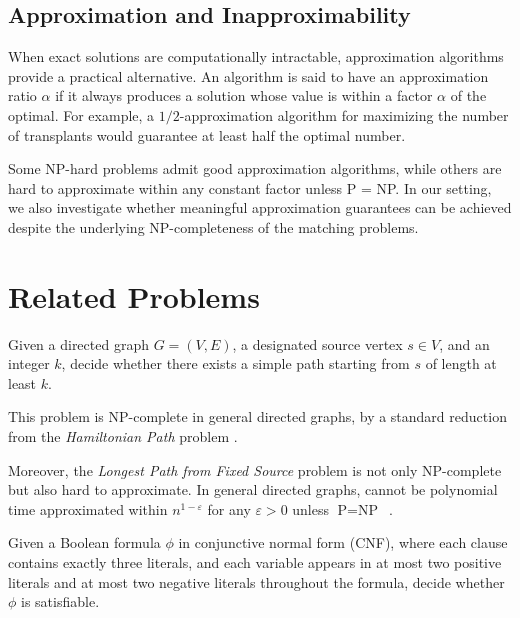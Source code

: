 \subsection*{Approximation and Inapproximability}

When exact solutions are computationally intractable, approximation algorithms provide a practical alternative. An algorithm is said to have an approximation ratio $\alpha$ if it always produces a solution whose value is within a factor $\alpha$ of the optimal. For example, a $1/2$-approximation algorithm for maximizing the number of transplants would guarantee at least half the optimal number.

Some NP-hard problems admit good approximation algorithms, while others are hard to approximate within any constant factor unless P = NP. In our setting, we also investigate whether meaningful approximation guarantees can be achieved despite the underlying NP-completeness of the matching problems.


\section{Related Problems}

\begin{problem}
\label{prob:longest_simple_path}
Given a directed graph $G = (V, E)$, a designated source vertex $s \in V$, and an integer $k$, decide whether there exists a simple path starting from $s$ of length at least $k$.
\end{problem}

This problem is NP-complete in general directed graphs, by a standard reduction from the \textit{Hamiltonian Path} problem \cite{garey1979computers}.

Moreover, the \textit{Longest Path from Fixed Source} problem is not only NP-complete but also hard to approximate. In general directed graphs, cannot be polynomial time approximated
within $n^{1-\varepsilon}$ for any $\varepsilon  > 0$ unless $\text{P} = \text{NP}$~\cite{bjorklund2004approximating}.

\begin{problem}[2P2N-3SAT]
\label{prob:2p2n_3sat}
Given a Boolean formula $\phi$ in conjunctive normal form (CNF), where each clause contains exactly three literals, and each variable appears in at most two positive literals and at most two negative literals throughout the formula, decide whether $\phi$ is satisfiable.
\end{problem}

